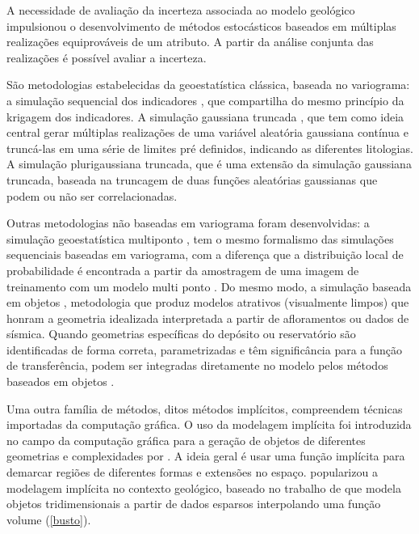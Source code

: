 A necessidade de avaliação da incerteza associada ao modelo geológico impulsionou o desenvolvimento de métodos estocásticos baseados em múltiplas realizações equiprováveis de um atributo. A partir da análise conjunta das realizações é possível avaliar a incerteza. 

São metodologias estabelecidas da geoestatística clássica, baseada no variograma: a simulação sequencial dos indicadores \cite{goovaerts1997geostatistics}, que compartilha do mesmo princípio da krigagem dos indicadores. A simulação gaussiana truncada \cite{matheron1987conditional}, que tem como ideia central gerar múltiplas realizações de uma variável aleatória gaussiana contínua e truncá-las em uma série de limites pré definidos, indicando as diferentes litologias. A simulação plurigaussiana truncada, \cite{galli1994pros} que é uma extensão da simulação gaussiana truncada, baseada na truncagem de duas funções aleatórias gaussianas que podem ou não ser correlacionadas.

Outras metodologias não baseadas em variograma foram desenvolvidas: a simulação geoestatística multiponto \cite{strebellesimulationscomplexgeology}, tem o mesmo formalismo das simulações sequenciais baseadas em variograma, com a diferença que a distribuição local de probabilidade é encontrada a partir da amostragem de uma imagem de treinamento com um modelo multi ponto \cite{pyrcz2014geostatistical}. Do mesmo modo, a simulação baseada em objetos \cite{alabert1992stochastic, bratvold1995storm, holden1998modeling}, metodologia que produz modelos atrativos (visualmente limpos) que honram a geometria idealizada interpretada a partir de afloramentos ou dados de sísmica. Quando geometrias específicas do depósito ou reservatório são identificadas de forma correta, parametrizadas e têm significância para a função de transferência, podem ser integradas diretamente no modelo pelos métodos baseados em objetos \cite{pyrcz2005stochastic}. 

Uma outra família de métodos, ditos métodos implícitos, compreendem técnicas importadas da computação gráfica. O uso da modelagem implícita foi introduzida no campo da computação gráfica para a geração de objetos de diferentes geometrias e complexidades por  . A ideia geral é usar uma função implícita para demarcar regiões de diferentes formas e extensões no espaço.  popularizou a modelagem implícita no contexto geológico, baseado no trabalho de  que modela objetos tridimensionais a partir de dados esparsos interpolando uma função volume (\autoref{busto}).

